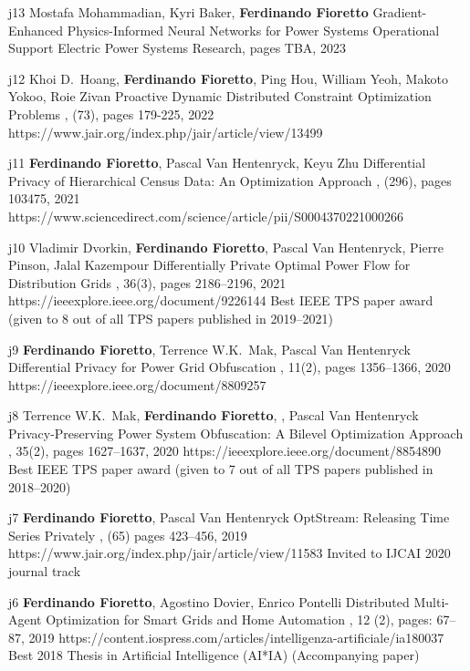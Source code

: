 \begin{pubs}

	\journalentry
	{j13}
	{Mostafa Mohammadian, Kyri Baker, \textbf{Ferdinando Fioretto}}
	{Gradient-Enhanced Physics-Informed Neural Networks for Power Systems Operational Support}
	{Electric Power Systems Research, pages TBA, 2023}
	{}

	\journalentry
	{j12} %
	{Khoi D.~Hoang, \textbf{Ferdinando Fioretto}, Ping Hou, William Yeoh, Makoto Yokoo, Roie Zivan}
	{Proactive Dynamic Distributed Constraint Optimization Problems}
	{\JAIR, (73), pages 179-225, 2022}
	{https://www.jair.org/index.php/jair/article/view/13499}

	\journalentry
	{j11} %
		{\textbf{Ferdinando Fioretto}, Pascal Van Hentenryck, Keyu Zhu}
		{Differential Privacy of Hierarchical Census Data: An Optimization Approach}
		{\AIJ, (296), pages 103475, 2021}
		{https://www.sciencedirect.com/science/article/pii/S0004370221000266}

	\journalentryAwd
	{j10} %
		{Vladimir Dvorkin, {\bf Ferdinando Fioretto}, Pascal Van Hentenryck, Pierre Pinson, Jalal Kazempour}
		{Differentially Private Optimal Power Flow for Distribution Grids}
		{\TPS, 36(3), pages 2186--2196, 2021}
		{https://ieeexplore.ieee.org/document/9226144}
		{Best IEEE TPS paper award}
		{(given to 8 out of all TPS papers published in 2019--2021)}

	\journalentry
	{j9} %
		{{\bf Ferdinando Fioretto}, Terrence W.K.~Mak, Pascal Van Hentenryck}
		{Differential Privacy for Power Grid Obfuscation}
		{\TSG, 11(2), pages 1356--1366, 2020}
		{https://ieeexplore.ieee.org/document/8809257}

	\journalentryAwd
	{j8}	%
		{Terrence W.K.~Mak, {\bf Ferdinando Fioretto}, , Pascal Van Hentenryck}
		{Privacy-Preserving Power System Obfuscation: A Bilevel Optimization Approach}
		{\TPS, 35(2), pages 1627--1637, 2020}
		{https://ieeexplore.ieee.org/document/8854890}
		{Best IEEE TPS paper award}
		{(given to 7 out of all TPS papers published in 2018--2020)}

	\journalentryAwd
	{j7}	%
		{{\bf Ferdinando Fioretto}, Pascal Van Hentenryck}
		{OptStream: Releasing Time Series Privately}
		{\JAIR, (65) pages 423--456, 2019}
		{https://www.jair.org/index.php/jair/article/view/11583}
		{Invited to IJCAI 2020 journal track}
		{}

	\journalentryAwd
	{j6}	%
		{{\bf Ferdinando Fioretto}, Agostino Dovier, Enrico Pontelli}
		{Distributed Multi-Agent Optimization for Smart Grids and Home Automation}
		{,  12 (2), pages: 67--87, 2019}
		{https://content.iospress.com/articles/intelligenza-artificiale/ia180037}
		{Best 2018 Thesis in Artificial Intelligence (AI*IA)}
		{(Accompanying paper)}


\end{pubs}
